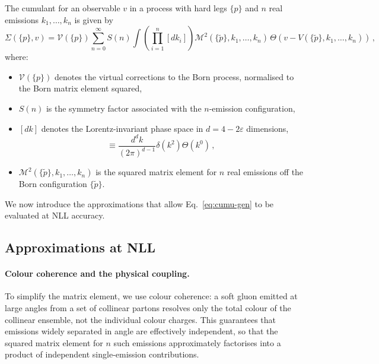 The cumulant for an observable $v$ in a process with hard legs
$\{p\}$ and $n$ real emissions $k_1,\dots,k_n$ is given by
\begin{equation}
\label{eq:cumu-gen}
\Sigma\left(\{p\},v\right)=\mathcal{V}(\{p\})\sum_{n=0}^\infty S(n) \int\left(\prod_{i=1}^n\left[dk_i\right]\right)\mathcal{M}^2\left(\{\tilde{p}\},k_1,\dots,k_n\right)\,\Theta\!\left(v-V\left(\{\tilde{p}\},k_1,\dots,k_n\right)\right)\,,
\end{equation}
where: 
\begin{itemize}
    \item $\mathcal{V}(\{p\})$ denotes the virtual corrections to the Born process, normalised to the Born matrix element squared,
    \item $S(n)$ is the symmetry factor associated with the $n$-emission configuration,
    \item $[dk]$ denotes the Lorentz-invariant phase space in $d=4-2\varepsilon$ dimensions, 
    \begin{equation}
    [dk] \equiv \frac{d^d k}{(2\pi)^{d-1}} \delta(k^2) \Theta(k^0)\,,
    \end{equation}
    \item $\mathcal{M}^2(\{\tilde{p}\},k_1,\dots,k_n)$ is the squared matrix element for $n$ real emissions off the Born configuration $\{\tilde{p}\}$.
\end{itemize}
We now introduce the approximations that allow Eq.~\eqref{eq:cumu-gen} to be evaluated at NLL
accuracy.

\subsection{Approximations at NLL}
\label{subsec:NLL-approx}

\paragraph{Colour coherence and the physical coupling.}
To simplify the matrix element, we use colour coherence: a soft gluon
emitted at large angles from a set of collinear partons resolves only the
total colour of the collinear ensemble, not the individual colour charges.
This guarantees that emissions widely separated in angle are effectively
independent, so that the squared matrix element for $n$ such emissions
approximately factorises into a product of independent single-emission
contributions.

